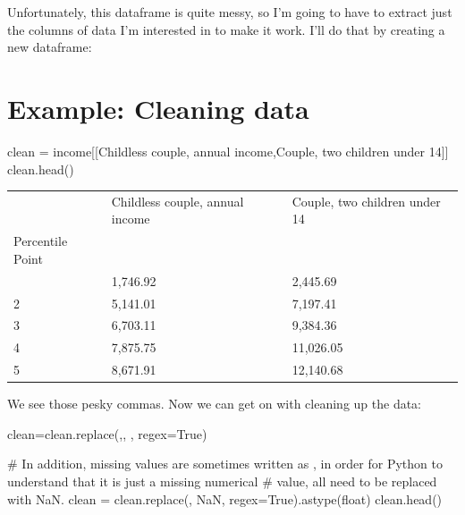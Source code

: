 \documentclass[
  letterpaper,
  DIV=11,
  numbers=noendperiod]{scrreprt}
\newenvironment{Shaded}{\begin{snugshade}}{\end{snugshade}}
\newcommand{\CommentTok}[1]{\textcolor[rgb]{0.37,0.37,0.37}{#1}}
\newcommand{\NormalTok}[1]{\textcolor[rgb]{0.00,0.23,0.31}{#1}}
\newcommand{\OperatorTok}[1]{\textcolor[rgb]{0.37,0.37,0.37}{#1}}
\newcommand{\StringTok}[1]{\textcolor[rgb]{0.13,0.47,0.30}{#1}}
\newcommand{\VariableTok}[1]{\textcolor[rgb]{0.07,0.07,0.07}{#1}}
\begin{document}
Unfortunately, this dataframe is quite messy, so I'm going to have to
extract just the columns of data I'm interested in to make it work. I'll
do that by creating a new dataframe:

\hypertarget{example-cleaning-data}{%
\section{Example: Cleaning data}\label{example-cleaning-data}}

\begin{Shaded}
\begin{Highlighting}[]
\NormalTok{clean }\OperatorTok{=}\NormalTok{ income[[}\StringTok{\textquotesingle{}Childless couple, annual income\textquotesingle{}}\NormalTok{,}\StringTok{\textquotesingle{}Couple, two children under 14\textquotesingle{}}\NormalTok{]]}
\NormalTok{clean.head()}
\end{Highlighting}
\end{Shaded}

\begin{longtable}[]{@{}lll@{}}
\toprule\noalign{}
& Childless couple, annual income & Couple, two children under 14 \\
Percentile Point & & \\
\midrule\noalign{}
\endhead
\bottomrule\noalign{}
\endlastfoot
1 & 1,746.92 & 2,445.69 \\
2 & 5,141.01 & 7,197.41 \\
3 & 6,703.11 & 9,384.36 \\
4 & 7,875.75 & 11,026.05 \\
5 & 8,671.91 & 12,140.68 \\
\end{longtable}

We see those pesky commas. Now we can get on with cleaning up the data:

\begin{Shaded}
\begin{Highlighting}[]
\NormalTok{clean}\OperatorTok{=}\NormalTok{clean.replace(}\StringTok{\textquotesingle{},\textquotesingle{}}\NormalTok{, }\StringTok{\textquotesingle{}\textquotesingle{}}\NormalTok{, regex}\OperatorTok{=}\VariableTok{True}\NormalTok{)}

\CommentTok{\# In addition, missing values are sometimes written as \textquotesingle{}{-}\textquotesingle{}, in order for Python to understand that it is just a missing numerical }
\CommentTok{\# value, all \textquotesingle{}{-}\textquotesingle{} need to be replaced with \textquotesingle{}NaN\textquotesingle{}.}
\NormalTok{clean }\OperatorTok{=}\NormalTok{ clean.replace(}\StringTok{\textquotesingle{}{-}\textquotesingle{}}\NormalTok{, }\StringTok{\textquotesingle{}NaN\textquotesingle{}}\NormalTok{, regex}\OperatorTok{=}\VariableTok{True}\NormalTok{).astype(}\StringTok{\textquotesingle{}float\textquotesingle{}}\NormalTok{)}
\NormalTok{clean.head()}
\end{Highlighting}
\end{Shaded}
\end{document}
